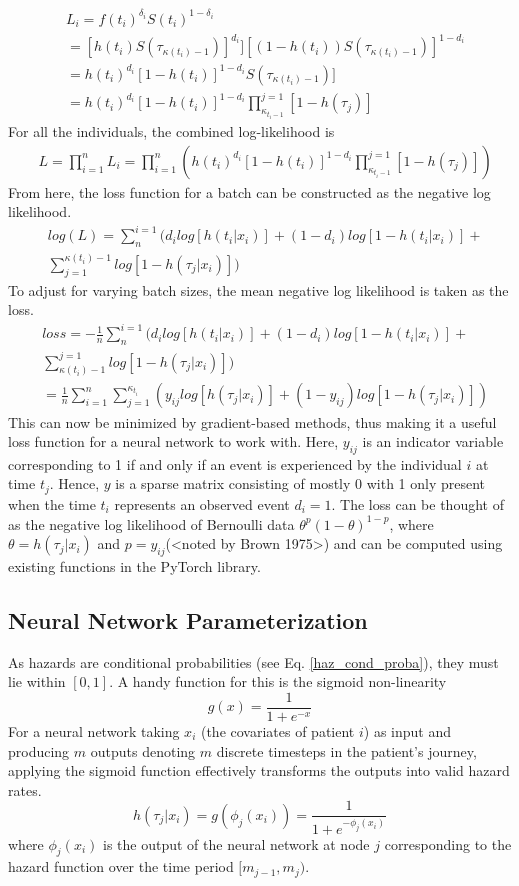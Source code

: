 \documentclass[%
 reprint,
 amsmath,amssymb,
 aps,
]{revtex4-2}
\begin{document}
\begin{align*}
&L_i = f(t_i)^{\delta_i}S(t_i)^{1-\delta_i}\\
&= [h(t_i)S(\tau_{\kappa(t_i)-1})]^{d_i}][(1-h(t_i))S(\tau_{\kappa(t_i)-1})]^{1-d_i}\\
&= h(t_i)^{d_i}[1 - h(t_i)]^{1-d_i}S(\tau_{\kappa(t_i)-1})]\\
&= h(t_i)^{d_i}[1 - h(t_i)]^{1-d_i} \prod^{j=1}_{\kappa_{t_i-1}}[1 - h(\tau_j)]
\end{align*}
For all the individuals, the combined log-likelihood is
\begin{align*}
&L = \prod^{n}_{i=1}L_i = \prod^{n}_{i=1}\left(h(t_i)^{d_i}[1 - h(t_i)]^{1-d_i} \prod^{j=1}_{\kappa_{t_i-1}}[1 - h(\tau_j)]\right)
\end{align*}
From here, the loss function for a batch can be constructed as the negative log likelihood.
\begin{align*}
&log(L) = \sum^{i=1}_{n}\Bigg(d_i log[h(t_i|x_i)]+(1-d_i)log[1-h(t_i|x_i)]+\\
&\sum^{\kappa(t_i)-1}_{j=1}log[1 - h(\tau_j|x_i)] \Bigg)
\end{align*}
To adjust for varying batch sizes, the mean negative log likelihood is taken as the loss.
\begin{align*}
&loss = -\frac{1}{n}\sum^{i=1}_{n}\Bigg(d_i log[h(t_i|x_i)]+(1-d_i)log[1-h(t_i|x_i)]+\\
&\sum^{j=1}_{\kappa(t_i)-1}log[1 - h(\tau_j|x_i)] \Bigg) \\
&= \frac{1}{n}\sum^{n}_{i=1}\sum^{\kappa_{t_i}}_{j=1}(y_{ij}log[h(\tau_j|x_i)]+(1-y_{ij})log[1-h(\tau_j|x_i)])
\end{align*}
This can now be minimized by gradient-based methods, thus making it a useful loss function for a neural network to work with. Here, $y_{ij}$ is an indicator variable corresponding to 1 if and only if an event is experienced by the individual $i$ at time $t_j$. Hence, $y$ is a sparse matrix consisting of mostly 0 with 1 only present when the time $t_i$ represents an observed event $d_i = 1$. The loss can be thought of as the negative log likelihood of Bernoulli data $\theta^p(1-\theta)^{1-p}$, where $\theta=h(\tau_j|x_i)$ and $p=y_{ij}$(<noted by Brown 1975>) and can be computed using existing functions in the PyTorch library.\\

\subsection{\label{nn_param}Neural Network Parameterization}
As hazards are conditional probabilities (see Eq. \ref{haz_cond_proba}), they must lie within $[0,1]$. A handy function for this is the sigmoid non-linearity
\[
g(x) = \frac{1}{1+e^{-x}}
\]
For a neural network taking $x_i$ (the covariates of patient $i$) as input and producing $m$ outputs denoting $m$ discrete timesteps in the patient's journey, applying the sigmoid function effectively transforms the outputs into valid hazard rates.
\[
h(\tau_j|x_i) = g(\phi_j(x_i)) = \frac{1}{1+e^{-\phi_j(x_i)}}
\]
where $\phi_j(x_i)$ is the output of the neural network at node $j$ corresponding to the hazard function over the time period $[m_{j-1}, m_j)$.\\
\end{document}
